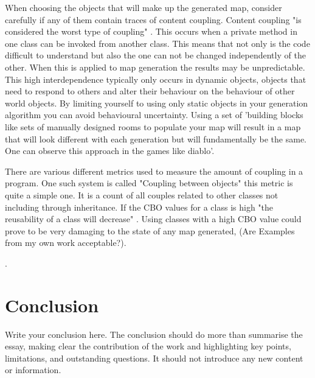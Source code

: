 \documentclass{scrartcl}
\begin{document}
When choosing the objects that will make up the generated map, consider carefully if any of them contain traces of content coupling. Content coupling "is considered the worst type of coupling" \cite[p. 95]{briand1999unified}. This occurs when a private method in one class can be invoked from another class. This means that not only is the code difficult to understand but also the one can not be changed independently of the other. When this is applied to map generation the results may be unpredictable. This high interdependence typically only occurs in dynamic objects, objects that need to respond to others and alter their behaviour on the behaviour of other world objects. By limiting yourself to using only static objects in your generation algorithm you can avoid behavioural uncertainty. Using a set of 'building blocks like sets of manually designed rooms to populate your map will result in a map that will look different with each generation but will fundamentally be the same. One can observe this approach in the games like diablo'\cite {togelius2013procedural}.

There are various different metrics used to measure the amount of coupling in a program. One such system is called "Coupling between objects" \cite {chidamber1994metrics} this metric is quite a simple one. It is a count of all couples related to other classes not including through inheritance. If the CBO values for a class is high "the reusability of a class will decrease" \cite[p. 468]{rathore2011novel}. Using classes with a high CBO value could prove to be very damaging to the state of any map generated, (Are Examples from my own work acceptable?).  



.
\section{Conclusion}

Write your conclusion here. The conclusion should do more than summarise the essay, making clear the contribution of the work and highlighting key points, limitations, and outstanding questions. It should not introduce any new content or information.



\end{document}
